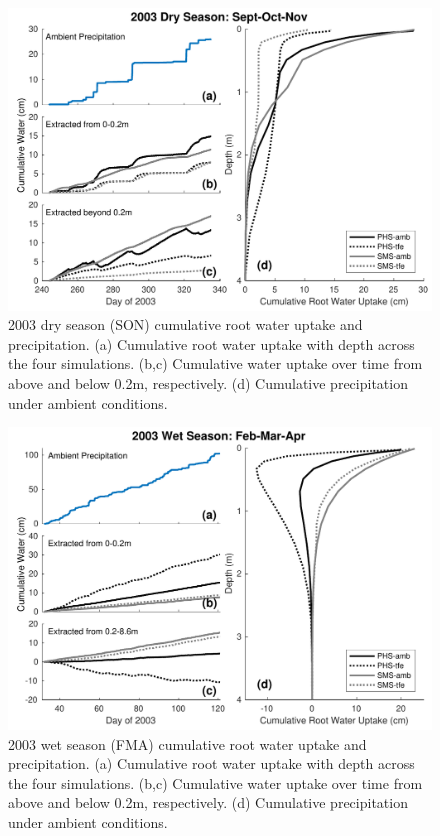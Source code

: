 \documentclass[draft,linenumbers]{agujournal}
\begin{document}
        \clearpage
    \begin{figure}[h]
     \centering
     \includegraphics[width=30pc]{../figs3/qdry.pdf}
     \caption{2003 dry season (SON) cumulative root water uptake and precipitation. 
     (a) Cumulative root water uptake with depth across the four simulations.
     (b,c) Cumulative water uptake over time from above and below 0.2m, respectively.
     (d) Cumulative precipitation under ambient conditions.
     }
     \label{fig:qdry}
  \end{figure}
  
        \clearpage
    \begin{figure}[h]
     \centering
     \includegraphics[width=30pc]{../figs3/qwet.pdf}
     \caption{2003 wet season (FMA) cumulative root water uptake and precipitation. 
     (a) Cumulative root water uptake with depth across the four simulations.
     (b,c) Cumulative water uptake over time from above and below 0.2m, respectively.
     (d) Cumulative precipitation under ambient conditions.
     }
     \label{fig:qwet}
  \end{figure}
  
\end{document}
